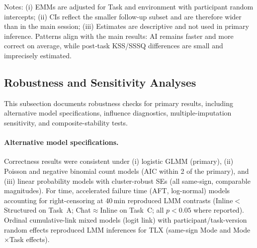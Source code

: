 \documentclass[sigconf]{acmart}
\begin{document}
\begin{table}[h!]
  \centering
  \caption{Exploratory next‑day follow‑up: adjusted means (EMMs) with 95\% CIs. Descriptive models parallel main‑session specifications; we refrain from multiple‑comparison testing.}
  \label{tab:followup}
  \small
  \vspace{0.25em}

  \raggedright \footnotesize Notes: (i) EMMs are adjusted for Task and environment with participant random intercepts; (ii) CIs reflect the smaller follow‑up subset and are therefore wider than in the main session; (iii) Estimates are descriptive and not used in primary inference. Patterns align with the main results: AI remains faster and more correct on average, while post‑task KSS/SSSQ differences are small and imprecisely estimated.
\end{table}



\subsection{Robustness and Sensitivity Analyses}

This subsection documents robustness checks for primary results, including alternative model specifications, influence diagnostics, multiple-imputation sensitivity, and composite-stability tests.

\paragraph{Alternative model specifications.}
Correctness results were consistent under (i) logistic GLMM (primary), (ii) Poisson and negative binomial count models (AIC within 2 of the primary), and (iii) linear probability models with cluster-robust SEs (all same-sign, comparable magnitudes). For time, accelerated failure time (AFT, log-normal) models accounting for right-censoring at 40\,min reproduced LMM contrasts (Inline$<$Structured on Task~A; Chat$\approx$Inline on Task~C; all $p<0.05$ where reported). Ordinal cumulative-link mixed models (logit link) with participant/task-version random effects reproduced LMM inferences for TLX (same-sign Mode and Mode\(\times\)Task effects).
\end{document}
